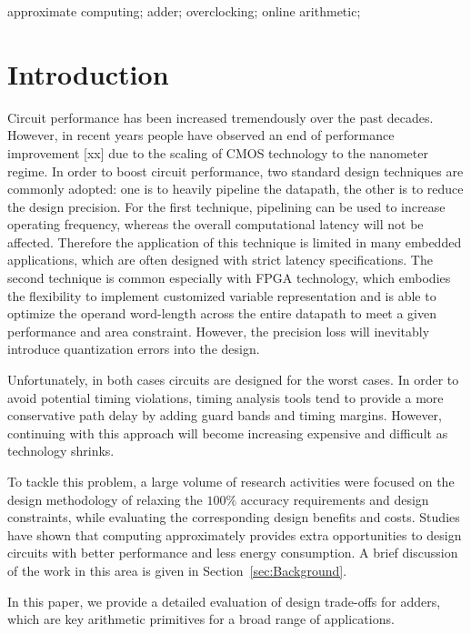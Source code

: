 \documentclass[10pt, conference, compsocconf]{IEEEtran}
\begin{document}
\begin{IEEEkeywords}
approximate computing; adder; overclocking; online arithmetic;

\end{IEEEkeywords}


\section{Introduction}
Circuit performance has been increased tremendously over the past decades. However, in recent years people have observed an end of performance improvement [xx] due to the scaling of CMOS technology to the nanometer regime. In order to boost circuit performance, two standard design techniques are commonly adopted: one is to heavily pipeline the datapath, the other is to reduce the design precision. For the first technique, pipelining can be used to increase operating frequency, whereas the overall computational latency will not be affected. Therefore the application of this technique is limited in many embedded applications, which are often designed with strict latency specifications. The second technique is common especially with FPGA technology, which embodies the flexibility to implement customized variable representation and is able to optimize the operand word-length across the entire datapath to meet a given performance and area constraint. However, the precision loss will inevitably introduce quantization errors into the design.

Unfortunately, in both cases circuits are designed for the worst cases. In order to avoid potential timing violations, timing analysis tools tend to provide a more conservative path delay by adding guard bands and timing margins. However, continuing with this approach will become increasing expensive and difficult as technology shrinks.

To tackle this problem, a large volume of research activities were focused on the design methodology of relaxing the $100\%$ accuracy requirements and design constraints, while evaluating the corresponding design benefits and costs. Studies have shown that computing approximately provides extra opportunities to design circuits with better performance and less energy consumption. A brief discussion of the work in this area is given in Section~\ref{sec:Background}.

In this paper, we provide a detailed evaluation of design trade-offs for adders, which are key arithmetic primitives for a broad range of applications.
\end{document}
